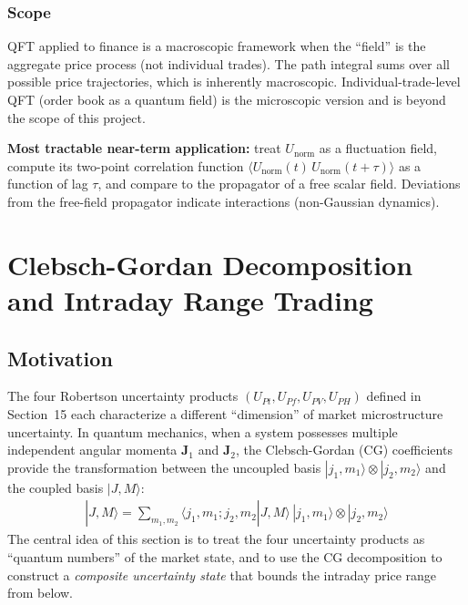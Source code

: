 \documentclass[preprint,12pt]{elsarticle}
\begin{document}
\subsubsection{Scope}

QFT applied to finance is a macroscopic framework when the ``field'' is the aggregate price process (not individual trades). The path integral sums over all possible price trajectories, which is inherently macroscopic. Individual-trade-level QFT (order book as a quantum field) is the microscopic version and is beyond the scope of this project.

\textbf{Most tractable near-term application:} treat $U_\mathrm{norm}$ as a fluctuation field, compute its two-point correlation function $\langle U_\mathrm{norm}(t)\, U_\mathrm{norm}(t+\tau) \rangle$ as a function of lag $\tau$, and compare to the propagator of a free scalar field. Deviations from the free-field propagator indicate interactions (non-Gaussian dynamics).

\section{Clebsch-Gordan Decomposition and Intraday Range Trading}

\subsection{Motivation}

The four Robertson uncertainty products $(U_{Pt}, U_{Pf}, U_{PV}, U_{PH})$ defined in Section~15 each characterize a different ``dimension'' of market microstructure uncertainty. In quantum mechanics, when a system possesses multiple independent angular momenta $\mathbf{J}_1$ and $\mathbf{J}_2$, the Clebsch-Gordan (CG) coefficients provide the transformation between the uncoupled basis $|j_1, m_1\rangle \otimes |j_2, m_2\rangle$ and the coupled basis $|J, M\rangle$:
\begin{align}
    |J, M\rangle = \sum_{m_1, m_2} \langle j_1, m_1; j_2, m_2 | J, M \rangle\, |j_1, m_1\rangle \otimes |j_2, m_2\rangle
\end{align}
The central idea of this section is to treat the four uncertainty products as ``quantum numbers'' of the market state, and to use the CG decomposition to construct a \textit{composite uncertainty state} that bounds the intraday price range from below.
\end{document}
